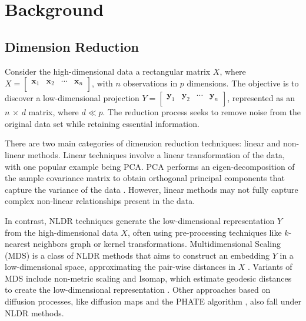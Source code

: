 \documentclass[
  12pt]{article}
\begin{document}
\hypertarget{sec-background}{%
\section{Background}\label{sec-background}}

\hypertarget{dimension-reduction}{%
\subsection{Dimension Reduction}\label{dimension-reduction}}

Consider the high-dimensional data a rectangular matrix \(X\), where
\(X = \begin{bmatrix} \textbf{x}_{1} & \textbf{x}_{2} & \cdots & \textbf{x}_{n}\\ \end{bmatrix}\),
with \(n\) observations in \(p\) dimensions. The objective is to
discover a low-dimensional projection
\(Y = \begin{bmatrix} \textbf{y}_{1} & \textbf{y}_{2} & \cdots & \textbf{y}_{n}\\ \end{bmatrix}\),
represented as an \(n\) × \(d\) matrix, where \(d \ll p\). The reduction
process seeks to remove noise from the original data set while retaining
essential information.

There are two main categories of dimension reduction techniques: linear
and non-linear methods. Linear techniques involve a linear
transformation of the data, with one popular example being PCA. PCA
performs an eigen-decomposition of the sample covariance matrix to
obtain orthogonal principal components that capture the variance of the
data \citep{Karl1901}. However, linear methods may not fully capture
complex non-linear relationships present in the data.

In contrast, NLDR techniques generate the low-dimensional representation
\(Y\) from the high-dimensional data \(X\), often using pre-processing
techniques like \(k\)-nearest neighbors graph or kernel transformations.
Multidimensional Scaling (MDS) is a class of NLDR methods that aims to
construct an embedding \(Y\) in a low-dimensional space, approximating
the pair-wise distances in \(X\) \citep{Torgerson1967}. Variants of MDS
include non-metric scaling \citep{article62} and Isomap, which estimate
geodesic distances to create the low-dimensional representation
\citep{article63}. Other approaches based on diffusion processes, like
diffusion maps \citep{article64} and the PHATE algorithm
\citep{article03}, also fall under NLDR methods.
\end{document}
